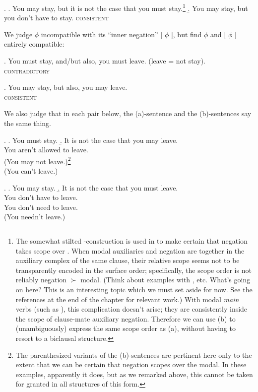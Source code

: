 \ex. \a. You may stay, but it is not the case that you must
stay.\footnote{The somewhat stilted -construction is used in to make certain that negation takes
  scope over . When modal auxiliaries and negation
  are together in the auxiliary complex of the same clause, their
  relative scope seems not to be transparently encoded in the surface
  order; specifically, the scope order is not reliably negation
  $\succ$ modal. (Think about examples with ,
   etc. What's going on here?
  This is an interesting topic which we must set aside for now. See
  the references at the end of the chapter for relevant work.) With
  modal \emph{main} verbs (such as ), this
  complication doesn't arise; they are consistently inside the scope
  of clause-mate auxiliary negation. Therefore we can use (b) to
  (unambiguously) express the same scope order as (a), without having
  to resort to a biclausal structure.} \b. You may stay, but you don't
have to stay. \hfill\textsc{consistent}

We judge  $\phi$ incompatible with its ``inner
negation''  [ $\phi$ ], but find
 $\phi$ and  [ $\phi$
] entirely compatible:

\ex. You must stay, and/but also, you must leave. (leave = not stay).\\
\null\hfill\textsc{contradictory}

\ex. You may stay, but also, you may leave. \\
\null\hfill\textsc{consistent}

We also judge that in each pair below, the (a)-sentence and the
(b)-sentences say the same thing.

\ex. \a. You must stay. \b. It is not the case that you may leave.\\
You aren't allowed to leave.\\
(You may not leave.)\footnote{The parenthesized variants of the (b)-sentences are pertinent here only to the extent that we can be certain that negation scopes over the modal. In these examples, apparently it does, but as we remarked above, this cannot be taken for granted in all structures of this form.}\\
(You can't leave.)

\ex. \a. You may stay. \b. It is not the case that you must leave.\\
You don't have to leave.\\
You don't need to leave.\\
(You needn't leave.)


